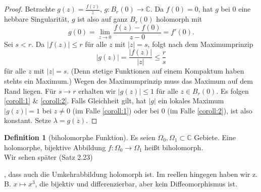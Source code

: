 \documentclass[11pt,titlepage]{article}
\theoremstyle{definition}
\newtheorem{definition}[theorem]{Definition}
\theoremstyle{remark}
\begin{document}
	\begin{proof}
		Betrachte $g(z)=\frac{f(z)}{z}$, $g:B_r(0)\to\mathbb{C}$. Da $f(0)=0$, hat $g$ bei $0$ 
		eine hebbare Singularität, $g$ ist also auf ganz $B_r(0)$ holomorph mit 
		\[ g(0)=\lim_{z\to 0}\frac{f(z)-f(0)}{z-0}=f'(0). \]
		Sei $s<r$. Da $|f(z)|\leq r$ für alle $z$ mit $|z|=s$, folgt nach dem Maximumprinzip
		\[ |g(z)| =\frac{|f(z)|}{|z|}\leq \frac{r}{s} \]
		für alle $z$ mit $|z|=s$. (Denn stetige Funktionen auf einem Kompaktum haben stehts ein 
		Maximum.) Wegen des Maximumprinzip muss das Maximum auf dem Rand liegen. 
		Für $s\to r$ erhalten wir $|g(z)|\leq 1$ für alle $ z\in B_r(0)$. Es folgen \ref{coroll:1} \& 
		\ref{coroll:2}. Falls Gleichheit gilt, hat $|g|$ ein lokales Maximum $|g(z)|=1$ bei $z\neq 0$ 
		(im Falle \ref{coroll:1}) oder bei $0$ (im Falle \ref{coroll:2}), ist also konstant. Setze 
		$\lambda=g(z)$.
	\end{proof}
	
	\begin{definition}[biholomorphe Funktion]
		Es seien $\Omega_0 ,\Omega_1\subset\mathbb{C}$ Gebiete. Eine holomorphe, bijektive 
		Abbildung $f:\Omega_0\to\Omega_1$ heißt biholomorph. \\
		Wir sehen später (Satz 2.23)
		
		
		, dass auch die Umkehrabbildung holomorph ist. Im reellen hingegen haben wir z. B. 
		$x\mapsto x^3$, die bijektiv und differenzierbar, aber kein Diffeomorphismus ist.
	\end{definition}
	
\end{document}

